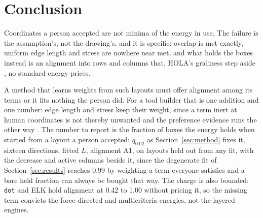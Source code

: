 \documentclass[a4paper,UKenglish]{gd-lipics-v3}
\begin{document}
\section{Conclusion}

Coordinates a person accepted are not minima of the energy in use. The failure is the
assumption's, not the drawing's, and it is specific: overlap is met exactly, uniform
edge length and stress are nowhere near met, and what holds the boxes instead is an
alignment into rows and columns that, HOLA's gridiness step aside \cite{hola16}, no
standard energy prices.

A method that learns weights from such layouts must offer alignment among its terms or it
fits nothing the person did. For a tool builder that is one addition and one number:
edge length and stress keep their weight, since a term inert at human coordinates is
not thereby unwanted and the preference evidence runs the other way
\cite{mooney25, dwyer09}. The number to report is the fraction of boxes
the energy holds when started from a layout a person accepted: $q_{0.02}$ as
Section~\ref{sec:method} fixes it, sixteen directions, fitted $L$, alignment A1, on
layouts held out from any fit, with the decrease and active columns beside it, since the
degenerate fit of Section~\ref{sec:results} reaches 0.99 by weighting a term everyone
satisfies and a bare held fraction can always be bought that way. The charge is also
bounded:
\texttt{dot} and ELK hold alignment at 0.42 to 1.00 without pricing it, so the missing
term convicts the force-directed and multicriteria energies, not the layered engines.
\end{document}
